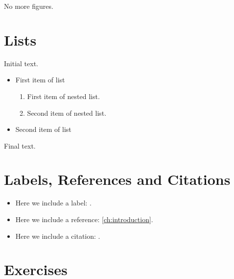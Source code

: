 \documentclass{camel}
\begin{document}
No more figures.

\chapter{Lists}\label{ch:lists}

Initial text.
\begin{itemize}
\item First item of list
\begin{enumerate}
\item First item of nested list.
\item Second item of nested list.
\end{enumerate}
\item Second item of list
\end{itemize}
Final text.

\chapter{Labels, References and Citations}

\begin{itemize}
\item Here we include a label: \label{ch:introduction}.
\item Here we include a reference: \ref{ch:introduction}.
\item Here we include a citation: \cite{video_ex.1.1.1}.
\end{itemize}

\chapter{Exercises}\label{ch:exercises}

\end{document}

